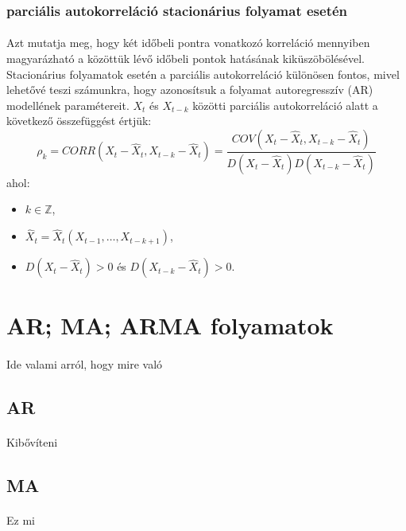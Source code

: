 \documentclass[11pt,a4pape,draftr]{article}
\begin{document}
					\subsubsection{parciális autokorreláció stacionárius folyamat esetén}
						\paragraph{}
							Azt mutatja meg, hogy két időbeli pontra vonatkozó korreláció mennyiben magyarázható a közöttük lévő időbeli pontok hatásának kiküszöbölésével. Stacionárius folyamatok esetén a parciális autokorreláció különösen fontos, mivel lehetővé teszi számunkra, hogy azonosítsuk a folyamat autoregresszív (AR) modellének paramétereit.
							$X_t$ és $X_{t-k}$ közötti parciális autokorreláció alatt a következő összefüggést értjük:
							\[
							\rho_k = CORR(X_t - \widehat{X}_t, X_{t-k} - \widehat{X}_{t}) = \frac{COV(X_t - \widehat{X}_t, X_{t-k} - \widehat{X}_{t})}{D(X_t - \widehat{X}_t)D(X_{t-k} - \widehat{X}_{t})}
							\]
							ahol:
							\begin{itemize}
								\item $k \in \mathbb{Z}$,
								\item $\widehat{X}_t = \widehat{X}_t(X_{t-1}, \dots, X_{t-k+1})$,
								\item $D(X_t - \hat{X}_t) > 0$ és $D(X_{t-k} - \hat{X}_t) > 0$.
							\end{itemize}

			\section{AR; MA; ARMA folyamatok}
				\paragraph{}
					Ide valami arról, hogy mire való
				\subsection{AR}
					\paragraph{}
						Kibővíteni
				\subsection{MA}
					\paragraph{}
						Ez mi
\end{document}
